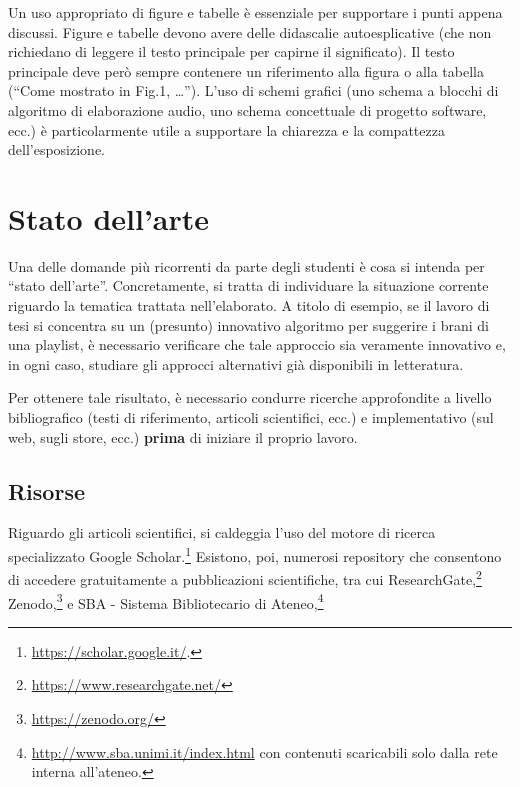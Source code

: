 \documentclass[12pt]{report}
\begin{document}
Un uso appropriato di figure e tabelle \`e essenziale per supportare i punti appena discussi. Figure e tabelle devono avere delle didascalie autoesplicative (che non richiedano di leggere il testo principale per capirne il significato). Il testo principale deve per\`o sempre contenere un riferimento alla figura o alla tabella (``Come mostrato in Fig.1, \ldots''). L'uso di schemi grafici (uno schema a blocchi di algoritmo di elaborazione audio, uno schema concettuale di progetto software, ecc.) \`e particolarmente utile a supportare la chiarezza e la compattezza dell'esposizione. 

% 
% 

\chapter{Stato dell'arte}
\label{chap:stato_arte}


Una delle domande più ricorrenti da parte degli studenti \`e cosa si intenda per ``stato dell'arte''. Concretamente, si tratta di individuare la situazione corrente riguardo la tematica trattata nell'elaborato. A titolo di esempio, se il lavoro di tesi si concentra su un (presunto) innovativo algoritmo per suggerire i brani di una playlist, è necessario verificare che tale approccio sia veramente innovativo e, in ogni caso, studiare gli approcci alternativi già disponibili in letteratura.

Per ottenere tale risultato, è necessario condurre ricerche approfondite a livello bibliografico (testi di riferimento, articoli scientifici, ecc.) e implementativo (sul web, sugli store, ecc.) \textbf{prima} di iniziare il proprio lavoro.

\section{Risorse}

Riguardo gli articoli scientifici, si caldeggia l'uso del motore di ricerca specializzato Google Scholar.\footnote{\url{https://scholar.google.it/}.} Esistono, poi, numerosi repository che consentono di accedere gratuitamente a pubblicazioni scientifiche, tra cui ResearchGate,\footnote{\url{https://www.researchgate.net/}} Zenodo,\footnote{\url{https://zenodo.org/}} e SBA - Sistema Bibliotecario di Ateneo,\footnote{\url{http://www.sba.unimi.it/index.html} con contenuti scaricabili solo dalla rete interna all'ateneo.}
\end{document}
